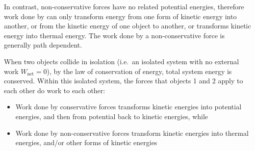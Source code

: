 In contrast, non-conservative forces have no related potential energies,
therefore work done by can only transform energy from one form of kinetic
energy into another, or from the kinetic energy of one object to another, or
transforms kinetic energy into thermal energy. The work done by a
non-conservative force is generally path dependent.

When two objects collide in isolation (i.e.\ an isolated system with no
external work $W_\text{net}=0$), by the law of conservation of energy, total
system energy is conserved. Within this isolated system, the forces that
objects 1 and 2 apply to each other do work to each other:
\begin{itemize}[itemsep=6pt]
\item Work done by conservative forces transforms kinetic energies into
  potential energies, and then from potential back to kinetic energies, while
\item Work done by non-conservative forces transform kinetic energies into
  thermal energies, and/or other forms of kinetic energies
\end{itemize}
%

